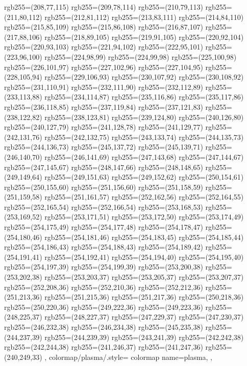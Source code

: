{{rgb255=(208,77,115)
rgb255=(209,78,114)
rgb255=(210,79,113)
rgb255=(211,80,112)
rgb255=(212,81,112)
rgb255=(213,83,111)
rgb255=(214,84,110)
rgb255=(215,85,109)
rgb255=(215,86,108)
rgb255=(216,87,107)
rgb255=(217,88,106)
rgb255=(218,89,105)
rgb255=(219,91,105)
rgb255=(220,92,104)
rgb255=(220,93,103)
rgb255=(221,94,102)
rgb255=(222,95,101)
rgb255=(223,96,100)
rgb255=(224,98,99)
rgb255=(224,99,98)
rgb255=(225,100,98)
rgb255=(226,101,97)
rgb255=(227,102,96)
rgb255=(227,104,95)
rgb255=(228,105,94)
rgb255=(229,106,93)
rgb255=(230,107,92)
rgb255=(230,108,92)
rgb255=(231,110,91)
rgb255=(232,111,90)
rgb255=(232,112,89)
rgb255=(233,113,88)
rgb255=(234,114,87)
rgb255=(235,116,86)
rgb255=(235,117,86)
rgb255=(236,118,85)
rgb255=(237,119,84)
rgb255=(237,121,83)
rgb255=(238,122,82)
rgb255=(238,123,81)
rgb255=(239,124,80)
rgb255=(240,126,80)
rgb255=(240,127,79)
rgb255=(241,128,78)
rgb255=(241,129,77)
rgb255=(242,131,76)
rgb255=(242,132,75)
rgb255=(243,133,74)
rgb255=(244,135,73)
rgb255=(244,136,73)
rgb255=(245,137,72)
rgb255=(245,139,71)
rgb255=(246,140,70)
rgb255=(246,141,69)
rgb255=(247,143,68)
rgb255=(247,144,67)
rgb255=(247,145,67)
rgb255=(248,147,66)
rgb255=(248,148,65)
rgb255=(249,149,64)
rgb255=(249,151,63)
rgb255=(249,152,62)
rgb255=(250,154,61)
rgb255=(250,155,60)
rgb255=(251,156,60)
rgb255=(251,158,59)
rgb255=(251,159,58)
rgb255=(251,161,57)
rgb255=(252,162,56)
rgb255=(252,164,55)
rgb255=(252,165,54)
rgb255=(252,166,54)
rgb255=(253,168,53)
rgb255=(253,169,52)
rgb255=(253,171,51)
rgb255=(253,172,50)
rgb255=(253,174,49)
rgb255=(254,175,49)
rgb255=(254,177,48)
rgb255=(254,178,47)
rgb255=(254,180,46)
rgb255=(254,181,46)
rgb255=(254,183,45)
rgb255=(254,185,44)
rgb255=(254,186,43)
rgb255=(254,188,43)
rgb255=(254,189,42)
rgb255=(254,191,41)
rgb255=(254,192,41)
rgb255=(254,194,40)
rgb255=(254,195,40)
rgb255=(254,197,39)
rgb255=(254,199,39)
rgb255=(253,200,38)
rgb255=(253,202,38)
rgb255=(253,203,37)
rgb255=(253,205,37)
rgb255=(253,207,37)
rgb255=(252,208,36)
rgb255=(252,210,36)
rgb255=(252,212,36)
rgb255=(251,213,36)
rgb255=(251,215,36)
rgb255=(251,217,36)
rgb255=(250,218,36)
rgb255=(250,220,36)
rgb255=(249,222,36)
rgb255=(249,223,36)
rgb255=(248,225,37)
rgb255=(248,227,37)
rgb255=(247,229,37)
rgb255=(247,230,37)
rgb255=(246,232,38)
rgb255=(246,234,38)
rgb255=(245,235,38)
rgb255=(244,237,39)
rgb255=(244,239,39)
rgb255=(243,241,39)
rgb255=(242,242,38)
rgb255=(242,244,38)
rgb255=(241,246,37)
rgb255=(241,247,36)
rgb255=(240,249,33)
	},
	colormap/plasma/.style={
        colormap name=plasma,
	},
}
